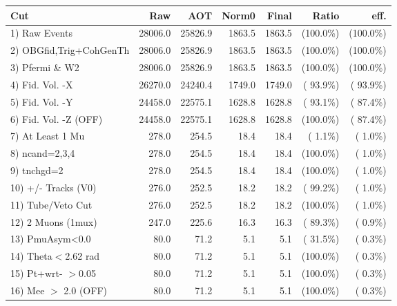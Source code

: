  \begin{table}[h!]\centering
 \begin{tabular}{||l||r|r|r|r|r|r||}
 \hline
 \hline
 Cut & Raw & AOT & Norm0 & Final & Ratio & eff.       \\
 \hline
  1) Raw Events           &      28006.0 &      25826.9 &       1863.5 &       1863.5 & (100.0\%) & (100.0\%) \\
  2) OBGfid,Trig+CohGenTh &      28006.0 &      25826.9 &       1863.5 &       1863.5 & (100.0\%) & (100.0\%) \\
  3) Pfermi \& W2         &      28006.0 &      25826.9 &       1863.5 &       1863.5 & (100.0\%) & (100.0\%) \\
  4) Fid. Vol. -X         &      26270.0 &      24240.4 &       1749.0 &       1749.0 & ( 93.9\%) & ( 93.9\%) \\
  5) Fid. Vol. -Y         &      24458.0 &      22575.1 &       1628.8 &       1628.8 & ( 93.1\%) & ( 87.4\%) \\
  6) Fid. Vol. -Z (OFF)   &      24458.0 &      22575.1 &       1628.8 &       1628.8 & (100.0\%) & ( 87.4\%) \\
  7) At Least 1 Mu        &        278.0 &        254.5 &         18.4 &         18.4 & (  1.1\%) & (  1.0\%) \\
  8) ncand=2,3,4          &        278.0 &        254.5 &         18.4 &         18.4 & (100.0\%) & (  1.0\%) \\
  9) tnchgd=2             &        278.0 &        254.5 &         18.4 &         18.4 & (100.0\%) & (  1.0\%) \\
 10) +/- Tracks (V0)      &        276.0 &        252.5 &         18.2 &         18.2 & ( 99.2\%) & (  1.0\%) \\
 11) Tube/Veto Cut        &        276.0 &        252.5 &         18.2 &         18.2 & (100.0\%) & (  1.0\%) \\
 12) 2 Muons (1mux)       &        247.0 &        225.6 &         16.3 &         16.3 & ( 89.3\%) & (  0.9\%) \\
 13) PmuAsym<0.0          &         80.0 &         71.2 &          5.1 &          5.1 & ( 31.5\%) & (  0.3\%) \\
 14) Theta$<$2.62 rad     &         80.0 &         71.2 &          5.1 &          5.1 & (100.0\%) & (  0.3\%) \\
 15) Pt+wrt- $>$0.05      &         80.0 &         71.2 &          5.1 &          5.1 & (100.0\%) & (  0.3\%) \\
 16) Mee $>$ 2.0  (OFF)   &         80.0 &         71.2 &          5.1 &          5.1 & (100.0\%) & (  0.3\%) \\

\end{tabular}
\end{table}
